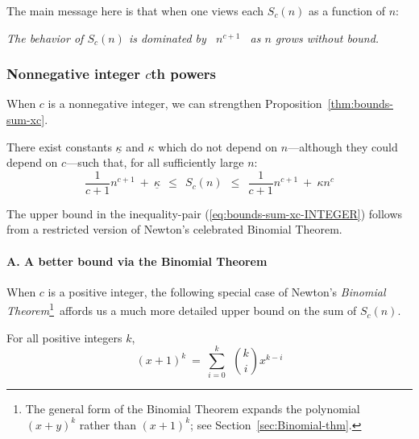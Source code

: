 \noindent
The main message here is that when one views each $S_c(n)$ as a function of $n$:

\smallskip

\begin{center}
{\em The behavior of $S_c(n)$ is dominated by \ $n^{c+1}$ \ as $n$ grows without bound.}
\end{center}

\subsubsection{Nonnegative integer $c$th powers}
\label{sec:positive-integer-power}

When $c$ is a nonnegative integer, we can strengthen Proposition~\ref{thm:bounds-sum-xc}.

\begin{prop}
\label{thm:bounds-sum-xc-INTEGER}
There exist constants $\underline{\kappa}$ and $\kappa$ which do not depend on $n$---although they could depend on $c$---such that, for all sufficiently large $n$:
\begin{equation}
\label{eq:bounds-sum-xc-INTEGER}
\frac{1}{c+1} n^{c+1} \ + \ \underline{\kappa}
  \ \ \leq \ \ S_c(n)
  \ \ \leq \ \ \frac{1}{c+1} n^{c+1} \ + \ \kappa n^c
\end{equation}
\end{prop}

The upper bound in the inequality-pair (\ref{eq:bounds-sum-xc-INTEGER}) follows from a restricted version of Newton's celebrated Binomial Theorem.


\paragraph{A. A better bound via the Binomial Theorem}

When $c$ is a positive integer, the following special case of Newton's {\it Binomial Theorem}\footnote{The general form of the Binomial Theorem expands the polynomial $(x+y)^k$ rather than $(x+1)^k$; see Section~\ref{sec:Binomial-thm}.}~affords us a much more detailed upper bound on the sum of $S_c(n)$.

\begin{theorem}
\label{thm:restricted-binomial-thm}
For all positive integers $k$,
\begin{equation}
\label{eq:restricted-binomial-thm}
(x+1)^k \ = \ \sum_{i=0}^k \ \ {k \choose i} x^{k-i}
\end{equation}
\end{theorem}

